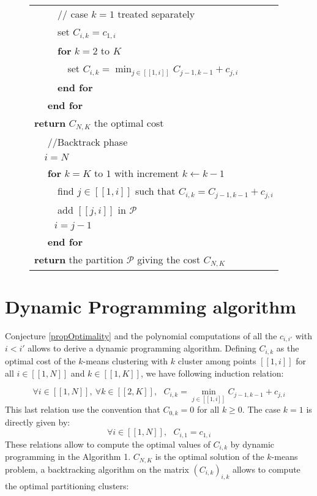 \documentclass{meta}
\def\PP{{\mathcal{P}}}
\begin{document}
\begin{figure}[ht]
\begin{tabular}{ l }
\verb!    ! // case $k=1$ treated separately\\
\verb!    ! set $C_{i,k} = c_{1,i}$\\
\verb!    ! \textbf{for} $k=2$ to $K$ \\
\verb!      ! set $C_{i,k} = \min_{j \in [\![1,i]\!]} C_{j-1,k-1} + c_{j,i}$\\
\verb!    ! \textbf{end for} \\
\verb!  ! \textbf{end for} \\
\textbf{return} $C_{N,K}$ the optimal cost \\

\verb!  ! //Backtrack phase\\
\verb!  ! $i=N$\\
\verb!  ! \textbf{for} $k=K$ to $1$ with increment $k \leftarrow k-1$\\
\verb!    ! find $j\in [\![1,i]\!]$ such that $C_{i,k} = C_{j-1,k-1} + c_{j,i}$\\
\verb!    ! add $[\![j,i]\!]$ in $\PP$\\
\verb!    ! %
$i=j-1$\\
\verb!  ! \textbf{end for} \\

\textbf{return} the partition $\PP$ giving the cost $C_{N,K}$\\
\hline
\end{tabular}
\end{figure}


\section{Dynamic Programming algorithm}



Conjecture \ref{propOptimality} and the polynomial computations of all the $c_{i,i'}$ with $i<i'$
allows to derive a dynamic programming algorithm.
Defining $C_{i,k}$ as the optimal cost of the $k$-means clustering with $k$ cluster among points $[\![1,i]\!]$ for all $i \in [\![1,N]\!]$ and $k \in [\![1,K]\!]$,
we have following induction relation:

\begin{equation}\label{inducForm}
\forall i \in [\![1,N]\!], \: \forall k \in [\![2,K]\!], \:\:\: C_{i,k} = \min_{j \in [\![1,i]\!]} C_{j-1,k-1} + c_{j,i}
\end{equation}
This last relation use the convention that $C_{0,k} = 0$ for all $k\geqslant0$.
The case $k=1$ is directly given by:
\begin{equation}
\forall i \in [\![1,N]\!], \:\:\: C_{i,1} =  c_{1,i}
\end{equation}
These relations allow to compute the optimal values of $C_{i,k}$ by dynamic programming in the Algorithm 1.
$C_{N,K}$ is the optimal solution of the $k$-means problem, a backtracking algorithm on the
matrix $(C_{i,k})_{i,k}$ allows to compute the optimal partitioning clusters:
\end{document}
